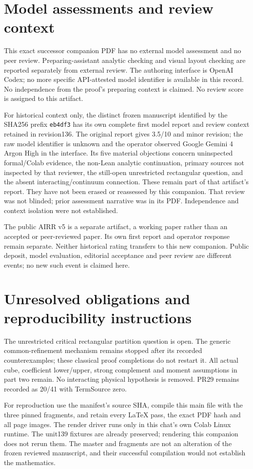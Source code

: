 \documentclass[11pt,a4paper]{article}
\begin{document}
\clearpage
\section{Model assessments and review context}
\label{sec:companion-review-context}
This exact successor companion PDF has no external model assessment and no peer
review. Preparing-assistant analytic checking and visual layout checking
are reported separately from external review. The authoring interface is
OpenAI Codex; no more specific API-attested model identifier is available
in this record. No independence from the proof's preparing context is
claimed. No review score is assigned to this artifact.

For historical context only, the distinct frozen manuscript identified by
the SHA256 prefix \texttt{eb4df3} has its own complete first model report and
review context retained in revision136. The original report gives
3.5/10 and minor revision; the raw model identifier is unknown and the
operator observed Google Gemini 4 Argon High in the interface. Its five
material objections concern uninspected formal/Colab evidence, the
non-Lean analytic continuation, primary sources not inspected by that
reviewer, the still-open unrestricted rectangular question, and the
absent interacting/continuum connection. These remain part of that
artifact's report. They have not been erased or reassessed by this
companion. That review was not blinded; prior assessment narrative was
in its PDF. Independence and context isolation were not established.

The public AIRR v5 is a separate artifact, a working paper rather than
an accepted or peer-reviewed paper. Its own first report and operator
response remain separate. Neither historical rating transfers to this
new companion. Public deposit, model evaluation, editorial acceptance
and peer review are different events; no new such event is claimed here.

\section{Unresolved obligations and reproducibility instructions}
The unrestricted critical rectangular partition question is open. The
generic common-refinement mechanism remains stopped after its recorded
counterexamples; these classical proof completions do not restart it.
All actual cube, coefficient lower/upper, strong complement and moment
assumptions in part two remain. No interacting physical hypothesis is
removed. PR29 remains recorded as 20/41 with TermSource zero.

For reproduction use the manifest's source SHA, compile this main file
with the three pinned fragments, and retain every LaTeX pass, the exact
PDF hash and all page images. The render driver runs only in this chat's
own Colab Linux runtime. The unit139 fixtures are already preserved;
rendering this companion does not rerun them. The master and fragments
are not an alteration of the frozen reviewed manuscript, and their
successful compilation would not establish the mathematics.
\end{document}
